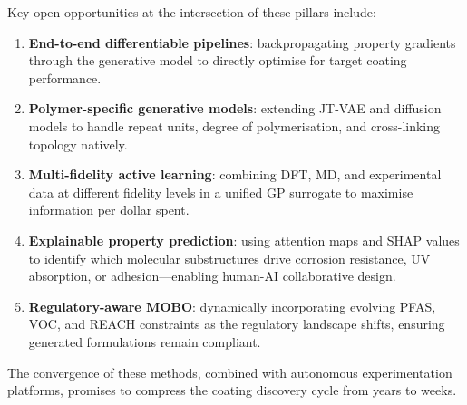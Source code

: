 \documentclass[11pt,a4paper]{article}
\begin{document}
Key open opportunities at the intersection of these pillars include:
\begin{enumerate}[nosep]
  \item \textbf{End-to-end differentiable pipelines}: backpropagating property gradients through the generative model to directly optimise for target coating performance.
  \item \textbf{Polymer-specific generative models}: extending JT-VAE and diffusion models to handle repeat units, degree of polymerisation, and cross-linking topology natively.
  \item \textbf{Multi-fidelity active learning}: combining DFT, MD, and experimental data at different fidelity levels in a unified GP surrogate to maximise information per dollar spent.
  \item \textbf{Explainable property prediction}: using attention maps and SHAP values to identify which molecular substructures drive corrosion resistance, UV absorption, or adhesion---enabling human-AI collaborative design.
  \item \textbf{Regulatory-aware MOBO}: dynamically incorporating evolving PFAS, VOC, and REACH constraints as the regulatory landscape shifts, ensuring generated formulations remain compliant.
\end{enumerate}

The convergence of these methods, combined with autonomous experimentation platforms, promises to compress the coating discovery cycle from years to weeks.
\end{document}

